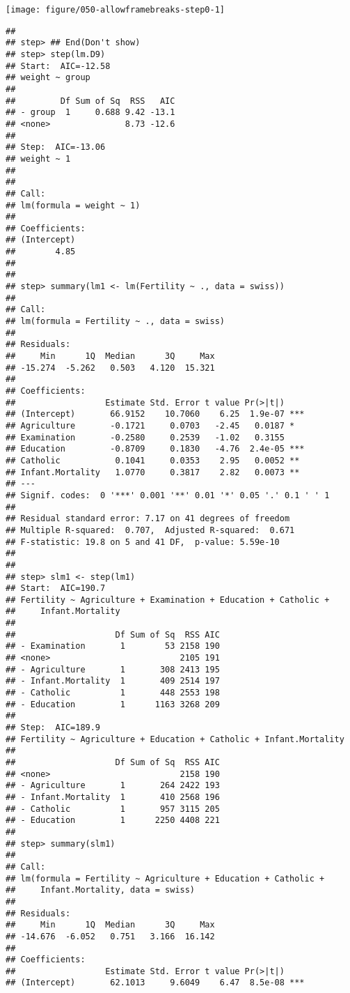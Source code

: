 \documentclass{beamer}\usepackage[]{graphicx}\usepackage[]{color}
\newenvironment{knitrout}{}{} %
\begin{document}
\begin{frame}
\begin{knitrout}
\texttt{[image: figure/050-allowframebreaks-step0-1]} 
\begin{verbatim}
## 
## step> ## End(Don't show)
## step> step(lm.D9)
## Start:  AIC=-12.58
## weight ~ group
## 
##         Df Sum of Sq  RSS   AIC
## - group  1     0.688 9.42 -13.1
## <none>               8.73 -12.6
## 
## Step:  AIC=-13.06
## weight ~ 1
## 
## 
## Call:
## lm(formula = weight ~ 1)
## 
## Coefficients:
## (Intercept)  
##        4.85  
## 
## 
## step> summary(lm1 <- lm(Fertility ~ ., data = swiss))
## 
## Call:
## lm(formula = Fertility ~ ., data = swiss)
## 
## Residuals:
##     Min      1Q  Median      3Q     Max 
## -15.274  -5.262   0.503   4.120  15.321 
## 
## Coefficients:
##                  Estimate Std. Error t value Pr(>|t|)    
## (Intercept)       66.9152    10.7060    6.25  1.9e-07 ***
## Agriculture       -0.1721     0.0703   -2.45   0.0187 *  
## Examination       -0.2580     0.2539   -1.02   0.3155    
## Education         -0.8709     0.1830   -4.76  2.4e-05 ***
## Catholic           0.1041     0.0353    2.95   0.0052 ** 
## Infant.Mortality   1.0770     0.3817    2.82   0.0073 ** 
## ---
## Signif. codes:  0 '***' 0.001 '**' 0.01 '*' 0.05 '.' 0.1 ' ' 1
## 
## Residual standard error: 7.17 on 41 degrees of freedom
## Multiple R-squared:  0.707,	Adjusted R-squared:  0.671 
## F-statistic: 19.8 on 5 and 41 DF,  p-value: 5.59e-10
## 
## 
## step> slm1 <- step(lm1)
## Start:  AIC=190.7
## Fertility ~ Agriculture + Examination + Education + Catholic + 
##     Infant.Mortality
## 
##                    Df Sum of Sq  RSS AIC
## - Examination       1        53 2158 190
## <none>                          2105 191
## - Agriculture       1       308 2413 195
## - Infant.Mortality  1       409 2514 197
## - Catholic          1       448 2553 198
## - Education         1      1163 3268 209
## 
## Step:  AIC=189.9
## Fertility ~ Agriculture + Education + Catholic + Infant.Mortality
## 
##                    Df Sum of Sq  RSS AIC
## <none>                          2158 190
## - Agriculture       1       264 2422 193
## - Infant.Mortality  1       410 2568 196
## - Catholic          1       957 3115 205
## - Education         1      2250 4408 221
## 
## step> summary(slm1)
## 
## Call:
## lm(formula = Fertility ~ Agriculture + Education + Catholic + 
##     Infant.Mortality, data = swiss)
## 
## Residuals:
##     Min      1Q  Median      3Q     Max 
## -14.676  -6.052   0.751   3.166  16.142 
## 
## Coefficients:
##                  Estimate Std. Error t value Pr(>|t|)    
## (Intercept)       62.1013     9.6049    6.47  8.5e-08 ***

\end{verbatim}
\end{knitrout}
\end{frame}
\end{document}
